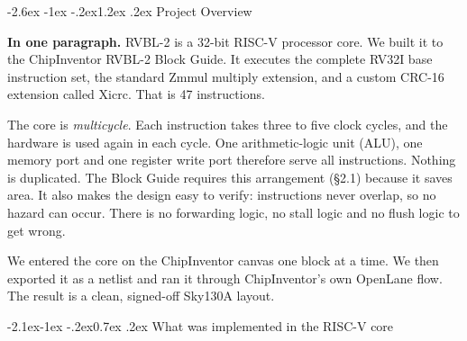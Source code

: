 \documentclass[11pt,a4paper]{article}
\makeatletter
\renewcommand\section{\@startsection{section}{1}{\z@}%
  {-2.6ex \@plus -1ex \@minus -.2ex}{1.2ex \@plus.2ex}%
  {\color{rvbl}\normalfont\large\bfseries}}
\renewcommand\subsection{\@startsection{subsection}{2}{\z@}%
  {-2.1ex\@plus -1ex \@minus -.2ex}{0.7ex \@plus .2ex}%
  {\color{rvbldark}\normalfont\normalsize\bfseries}}
\makeatother
\begin{document}
\section{Project Overview}
\label{sec:overview}

\textbf{In one paragraph.} RVBL-2 is a 32-bit RISC-V processor core. We built it to the
ChipInventor RVBL-2 Block Guide. It executes the complete RV32I base instruction set, the
standard Zmmul multiply extension, and a custom CRC-16 extension called Xicrc. That is 47
instructions.

The core is \emph{multicycle}. Each instruction takes three to five clock cycles, and the
hardware is used again in each cycle. One arithmetic-logic unit (ALU), one memory port and
one register write port therefore serve all instructions. Nothing is duplicated. The Block
Guide requires this arrangement (\S2.1) because it saves area. It also makes the design
easy to verify: instructions never overlap, so no hazard can occur. There is no forwarding
logic, no stall logic and no flush logic to get wrong.

We entered the core on the ChipInventor canvas one block at a time. We then exported it as
a netlist and ran it through ChipInventor's own OpenLane flow. The result is a clean,
signed-off Sky130A layout.

\subsection{What was implemented in the RISC-V core}
\end{document}
